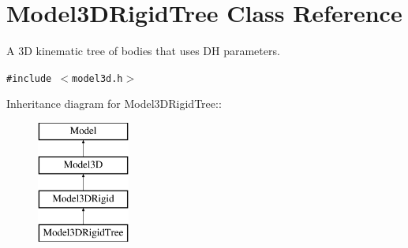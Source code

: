 \section{Model3DRigid\-Tree  Class Reference}
\label{class_Model3DRigidTree}
A 3D kinematic tree of bodies that uses DH parameters. 


{\tt \#include $<$model3d.h$>$}

Inheritance diagram for Model3DRigid\-Tree::\begin{figure}[H]
\begin{center}
\leavevmode
\includegraphics[height=4cm]{class_Model3DRigidTree}
\end{center}
\end{figure}
